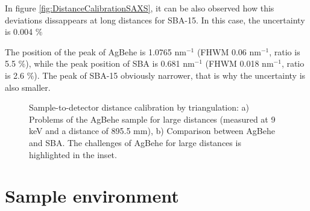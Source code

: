 In figure \ref{fig:DistanceCalibrationSAXS}, it can be also observed how this deviations dissappears at long distances for SBA-15. In this case, the uncertainty is 0.004 $\%$

The position of the peak of AgBehe is 1.0765 nm$^{-1}$ (FHWM 0.06 nm$^{-1}$, ratio is 5.5 $\%$), while the peak position of SBA is 0.681 nm$^{-1}$ (FHWM 0.018 nm$^{-1}$, ratio is 2.6 $\%$). The peak of SBA-15 obviously narrower, that is why the uncertainty is also smaller.



\begin{figure}
	\centering
		\caption{Sample-to-detector distance calibration by triangulation: a) Problems of the AgBehe sample for large distances (measured at 9 keV and a distance of 895.5 mm), b) Comparison between AgBehe and SBA. The challenges of AgBehe for large distances is highlighted in the inset.}
\end{figure}

\section{Sample environment}

